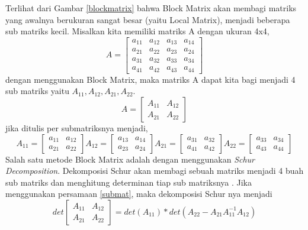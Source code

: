 \documentclass[12pt,a4paper]{report}
\begin{document}
	Terlihat dari Gambar \ref{blockmatrix} bahwa Block Matrix akan membagi matriks yang awalnya berukuran sangat besar (yaitu Local Matrix), menjadi beberapa sub matriks kecil. Misalkan kita memiliki matriks A dengan ukuran 4x4,
	\begin{equation}
	A = 
	\begin{bmatrix}
	\label{submat}
	a_{11} & a_{12} & a_{13} & a_{14} \\
	a_{21} & a_{22} & a_{23} & a_{24} \\
	a_{31} & a_{32} & a_{33} & a_{34} \\
	a_{41} & a_{42} & a_{43} & a_{44}
	\end{bmatrix}
	\end{equation}
	dengan menggunakan Block Matrix, maka matriks A dapat kita bagi menjadi 4 sub matriks yaitu {$A_{11}, A_{12}, A_{21}, A_{22}$}.
	\begin{equation}
	A = 
	\begin{bmatrix}
	A_{11} & A_{12} \\
	A_{21} & A_{22}
	\end{bmatrix}
	\end{equation}
	jika ditulis per submatriksnya menjadi,
	\begin{equation}
	A_{11} = 
	\begin{bmatrix}
	a_{11} & a_{12} \\
	a_{21} & a_{22}
	\end{bmatrix}
	A_{12} = 
	\begin{bmatrix}
	a_{13} & a_{14} \\
	a_{23} & a_{24}
	\end{bmatrix}
	A_{21} = 
	\begin{bmatrix}
	a_{31} & a_{32} \\
	a_{41} & a_{42}
	\end{bmatrix}
	A_{22} = 
	\begin{bmatrix}
	a_{33} & a_{34} \\
	a_{43} & a_{44}
	\end{bmatrix}
	\end{equation}
	Salah satu metode Block Matrix adalah dengan menggunakan \textit{Schur Decomposition}. Dekomposisi Schur akan membagi sebuah matriks menjadi 4 buah sub matriks dan menghitung determinan tiap sub matriksnya \cite{Gallier2010}. Jika menggunakan persamaan \eqref{submat}, maka dekomposisi Schur nya menjadi
	\begin{equation}
	\label{schur}
	det\begin{bmatrix}
	A_{11} & A_{12} \\
	A_{21} & A_{22}
	\end{bmatrix} = 
	det(A_{11}) * det(A_{22}-A_{21}A_{11}^{-1}A_{12})
	\end{equation}
	
\end{document}
